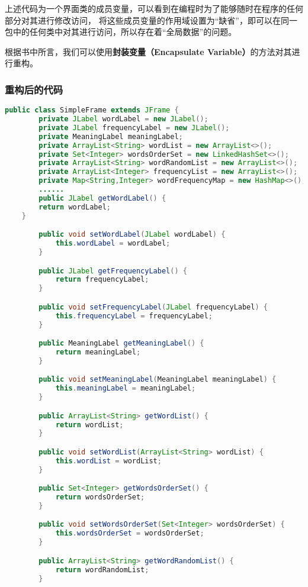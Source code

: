\documentclass[a4paper]{article}
\begin{document}
上述代码为一个界面类的成员变量，可以看到在编程时为了能够随时在程序的任何部分对其进行修改访问，
将这些成员变量的作用域设置为“缺省”，即可以在同一包中的任何类中对其进行访问，所以存在着“全局数据”的问题。

根据书中所言，我们可以使用\textbf{封装变量（Encapsulate Variable）}的方法对其进行重构。
\subsubsection*{重构后的代码}
\begin{lstlisting}[language={java}]
    public class SimpleFrame extends JFrame {
        private JLabel wordLabel = new JLabel();
        private JLabel frequencyLabel = new JLabel();
        private MeaningLabel meaningLabel;
        private ArrayList<String> wordList = new ArrayList<>();
        private Set<Integer> wordsOrderSet = new LinkedHashSet<>();
        private ArrayList<String> wordRandomList = new ArrayList<>();
        private ArrayList<Integer> frequencyList = new ArrayList<>();
        private Map<String,Integer> wordFrequencyMap = new HashMap<>();
        ......
        public JLabel getWordLabel() {
        return wordLabel;
    }

        public void setWordLabel(JLabel wordLabel) {
            this.wordLabel = wordLabel;
        }

        public JLabel getFrequencyLabel() {
            return frequencyLabel;
        }

        public void setFrequencyLabel(JLabel frequencyLabel) {
            this.frequencyLabel = frequencyLabel;
        }

        public MeaningLabel getMeaningLabel() {
            return meaningLabel;
        }

        public void setMeaningLabel(MeaningLabel meaningLabel) {
            this.meaningLabel = meaningLabel;
        }

        public ArrayList<String> getWordList() {
            return wordList;
        }

        public void setWordList(ArrayList<String> wordList) {
            this.wordList = wordList;
        }

        public Set<Integer> getWordsOrderSet() {
            return wordsOrderSet;
        }

        public void setWordsOrderSet(Set<Integer> wordsOrderSet) {
            this.wordsOrderSet = wordsOrderSet;
        }

        public ArrayList<String> getWordRandomList() {
            return wordRandomList;
        }


\end{lstlisting}
\end{document}
